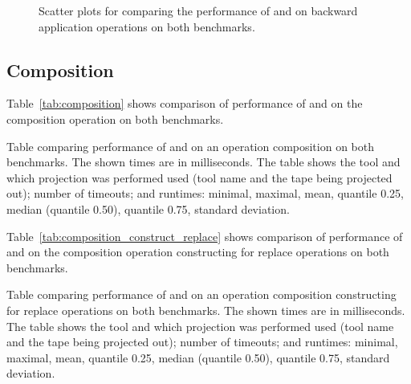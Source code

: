\begin{figure}[ht]
    \centering
    \quad
    \caption{
      Scatter plots for comparing the performance of \mata and \mona on backward application operations on both benchmarks.
    }
    \label{fig:apply_operation_backward}%
\end{figure}

\subsection{Composition}

Table~\ref{tab:composition} shows comparison of performance of \mata and \mona on the composition operation on both benchmarks.

\begin{table}[ht]
  \centering
  
  \caption{
    Table comparing performance of \mata and \mona on an operation composition on both benchmarks.
    The shown times are in milliseconds.
    The table shows the tool and which projection was performed used (tool name and the tape being projected out); number of timeouts; and runtimes: minimal, maximal, mean, quantile 0.25, median (quantile 0.50), quantile 0.75, standard deviation.
  }
  \label{tab:composition}
\end{table}

Table~\ref{tab:composition_construct_replace} shows comparison of performance of \mata and \mona on the composition operation constructing \nfts for replace operations on both benchmarks.

\begin{table}[ht]
  \centering
  
  \caption{
    Table comparing performance of \mata and \mona on an operation composition constructing \nfts for replace operations on both benchmarks.
    The shown times are in milliseconds.
    The table shows the tool and which projection was performed used (tool name and the tape being projected out); number of timeouts; and runtimes: minimal, maximal, mean, quantile 0.25, median (quantile 0.50), quantile 0.75, standard deviation.
  }
  \label{tab:composition_construct_replace}
\end{table}

